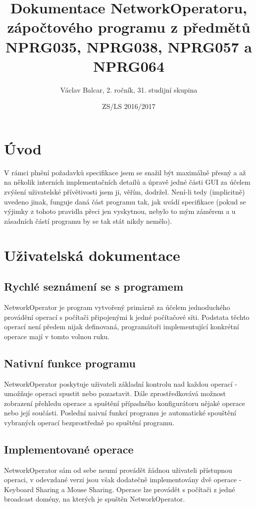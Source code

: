 \documentclass[12pt]{article}
\title{Dokumentace NetworkOperatoru, zápočtového programu z předmětů NPRG035, NPRG038, NPRG057 a NPRG064}
\date{ZS/LS 2016/2017}
\author{Václav Balcar, 2. ročník, 31. studijní skupina}
\begin{document}
\maketitle
\newpage
{}
\tableofcontents
\newpage
\section{Úvod}
V rámci plnění požadavků specifikace jsem se snažil být maximálně přesný a až na několik interních implementačních detailů a úpravě jedné části GUI za účelem zvýšení uživatelské přívětivosti jsem ji, věřím, dodržel. Není-li tedy (implicitně) uvedeno jinak, funguje daná část programu tak, jak uvádí specifikace (pokud se výjimky z tohoto pravidla přeci jen vyskytnou, nebylo to mým záměrem a u zásadních částí programu by se tak stát nikdy nemělo).
\newpage

\section{Uživatelská dokumentace}

\subsection{Rychlé seznámení se s programem}
NetworkOperator je program vytvořený primárně za účelem jednoduchého provádění operací s počítači připojenými k jedné počítačové síti. Podstata těchto operací není předem nijak definovaná, programátoři implementující konkrétní operace mají v tomto volnou ruku.

\subsection{Nativní funkce programu}
NetworkOperator poskytuje uživateli základní kontrolu nad každou operací - umožňuje operaci spustit nebo pozastavit. Dále zprostředkovává možnost zobrazení přehledu operace a spuštění případného konfigurátoru nějaké operace nebo její součásti. Poslední naivní funkcí programu je automatické spouštění vybraných operací bezprostředně po spuštění programu.

\subsection{Implementované operace}
NetworkOperator sám od sebe neumí provádět žádnou uživateli přístupnou operaci, v odevzdané verzi jsou však dodatečně implementovány dvě operace - Keyboard Sharing a Mouse Sharing.
Operace lze provádět s počítači z jedné broadcast domény, na kterých je spuštěn NetworkOperator.
\end{document}
